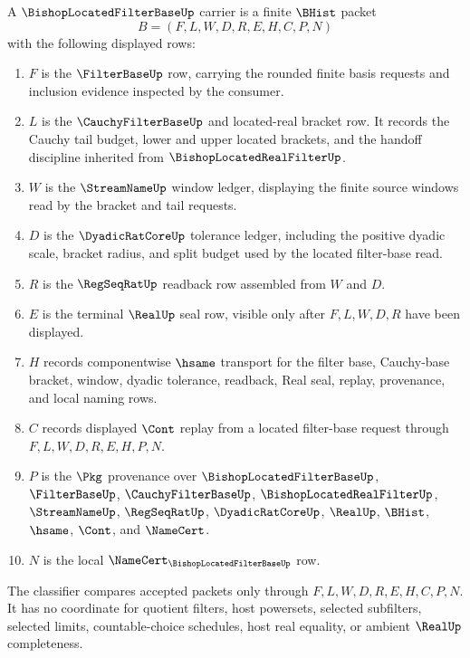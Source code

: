 \begin{definition}
\label{def:bishop-located-filter-base-carrier}
A $\BishopLocatedFilterBaseUp$ carrier is a finite $\BHist$ packet
$$
B=(F,L,W,D,R,E,H,C,P,N)
$$
with the following displayed rows:
\begin{enumerate}
\item $F$ is the $\FilterBaseUp$ row, carrying the rounded finite basis requests and inclusion evidence inspected by the consumer.
\item $L$ is the $\CauchyFilterBaseUp$ and located-real bracket row. It records the Cauchy tail budget, lower and upper located brackets, and the handoff discipline inherited from $\BishopLocatedRealFilterUp$.
\item $W$ is the $\StreamNameUp$ window ledger, displaying the finite source windows read by the bracket and tail requests.
\item $D$ is the $\DyadicRatCoreUp$ tolerance ledger, including the positive dyadic scale, bracket radius, and split budget used by the located filter-base read.
\item $R$ is the $\RegSeqRatUp$ readback row assembled from $W$ and $D$.
\item $E$ is the terminal $\RealUp$ seal row, visible only after $F,L,W,D,R$ have been displayed.
\item $H$ records componentwise $\hsame$ transport for the filter base, Cauchy-base bracket, window, dyadic tolerance, readback, Real seal, replay, provenance, and local naming rows.
\item $C$ records displayed $\Cont$ replay from a located filter-base request through $F,L,W,D,R,E,H,P,N$.
\item $P$ is the $\Pkg$ provenance over $\BishopLocatedFilterBaseUp$, $\FilterBaseUp$, $\CauchyFilterBaseUp$, $\BishopLocatedRealFilterUp$, $\StreamNameUp$, $\RegSeqRatUp$, $\DyadicRatCoreUp$, $\RealUp$, $\BHist$, $\hsame$, $\Cont$, and $\NameCert$.
\item $N$ is the local $\NameCert_{\BishopLocatedFilterBaseUp}$ row.
\end{enumerate}
The classifier compares accepted packets only through $F,L,W,D,R,E,H,C,P,N$. It has no coordinate for quotient filters, host powersets, selected subfilters, selected limits, countable-choice schedules, host real equality, or ambient $\RealUp$ completeness.
\end{definition}


